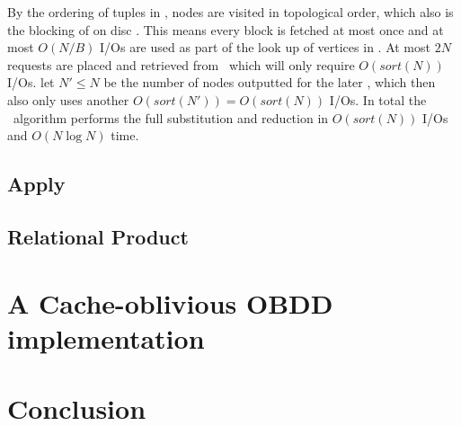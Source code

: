 By the ordering of tuples in \SubstituteQrec, nodes are visited in topological
order, which also is the blocking of on disc \GV. This means every block is
fetched at most once and at most $O(N/B)$ I/Os are used as part of the look up
of vertices in \GV. At most $2N$ requests are placed and retrieved from \Q\
which will only require $O(sort(N))$ I/Os. let $N' \leq N$ be the number of
nodes outputted for the later \Reduce, which then also only uses another
$O(sort(N')) = O(sort(N))$ I/Os. In total the \Substitute\ algorithm performs
the full substitution and reduction in $O(sort(N))$ I/Os and $O(N \log N)$ time.

\clearpage
\subsection{Apply}


\subsection{Relational Product}


\section{A Cache-oblivious OBDD implementation} \label{sec:implementation}


\section{Conclusion} \label{sec:conclusion}


\printbibliography




